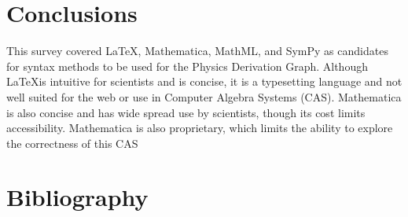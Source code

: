 \documentclass{article}
\begin{document}
\begin{multicols}{2}
\section{Conclusions}

This survey covered \LaTeX, Mathematica, MathML, and SymPy as candidates for syntax methods to be used for the Physics Derivation Graph. Although \LaTeX is intuitive for scientists and is concise, it is a typesetting language and not well suited for the web or use in Computer Algebra Systems (CAS). Mathematica is also concise and has wide spread use by scientists, though its cost limits accessibility. Mathematica is also proprietary, which limits the ability to explore the correctness of this CAS

\section{Bibliography}


\end{multicols}

\newpage
\appendix

\end{document}

